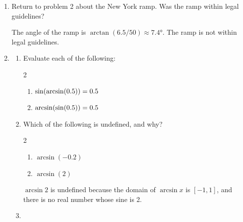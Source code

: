 \documentclass[main]{subfiles}
\begin{document}
\begin{enumerate}[resume]

\item 
\begin{problem}[\vfill\newpage]
Return to problem 2 about the New York ramp. Was the ramp within legal guidelines?
\end{problem}

\begin{solution} The angle of the ramp is $\arctan(6.5/50)\approx\ang{7.4}$.
The ramp is not within legal guidelines.
\end{solution}

\item
\begin{enumerate}
  \item
  \begin{problem}Evaluate each of the following:
  
  \begin{multicols}{2}
    \begin{enumerate}[topsep=0pt]
      \item $\sin(\arcsin(0.5))=0.5$
      \columnbreak
      \item $\arcsin(\sin(0.5))=0.5$
    \end{enumerate}
  \end{multicols}
  \vspace{-6pt}
  \end{problem}

  
  \item 
  \begin{problem}[\stretch{0.5}]
  Which of the following is undefined, and why?
  
  \begin{multicols}{2}
    \begin{enumerate}[topsep=0pt]
      \item $\arcsin(-0.2)$
      \columnbreak
      \item $\arcsin(2)$
    \end{enumerate}
  \end{multicols}
  \end{problem}
  
  \begin{solution}
    $\arcsin{2}$ is undefined because the domain
    of $\arcsin x$ is $[-1,1]$, and there is no real number whose sine is 2.
  \end{solution}


\item 


\end{enumerate}
\end{enumerate}
\end{document}
